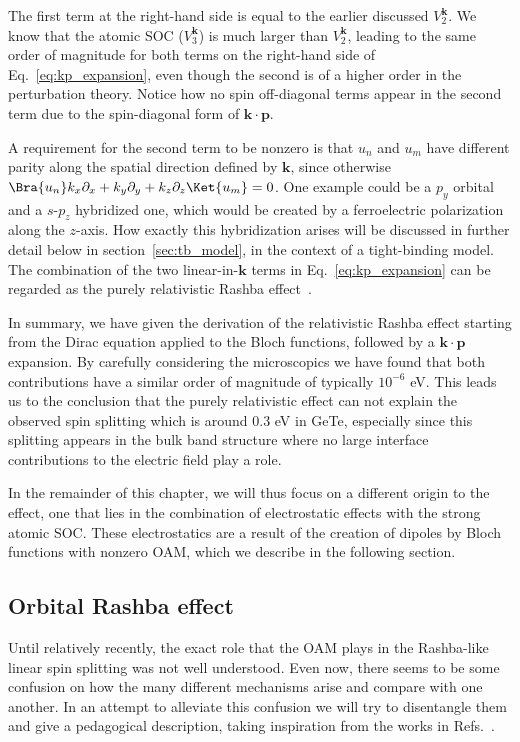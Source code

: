 The first term at the right-hand side is equal to the earlier discussed $V^{\bm k}_2$.
We know that the atomic SOC ($V^{\bm k}_3$) is much larger than $V^{\bm{k}}_2$, leading to the same order of magnitude for both terms on the right-hand side of Eq.~\eqref{eq:kp_expansion}, even though the second is of a higher order in the perturbation theory. Notice how no spin off-diagonal terms appear in the second term due to the spin-diagonal form of $\bm k \cdot \bm p$.

A requirement for the second term to be nonzero is that $u_n$ and $u_m$ have different parity along the spatial direction defined by $\bm{k}$, since otherwise $\Bra{u_n} k_x \partial_x + k_y \partial_y + k_z \partial_z \Ket{u_m} = 0$.
One example could be a $p_y$ orbital and a $s$-$p_z$ hybridized one, which would be created by a ferroelectric polarization along the $z$-axis.
How exactly this hybridization arises will be discussed in further detail below in section~\ref{sec:tb_model}, in the context of a tight-binding model.
The combination of the two linear-in-$\bm{k}$ terms in Eq.~\eqref{eq:kp_expansion} can be regarded as the purely relativistic Rashba effect~\cite{Bahramy2011}.
    
In summary, we have given the derivation of the relativistic Rashba effect starting from the Dirac equation applied to the Bloch functions, followed by a $\bm k \cdot \bm p$ expansion.
By carefully considering the microscopics we have found that both contributions have a similar order of magnitude of typically $10^{-6}$ eV.
This leads us to the conclusion that the purely relativistic effect can not explain the observed spin splitting which is around 0.3 eV in GeTe, especially since this splitting appears in the bulk band structure where no large interface contributions to the electric field play a role.

In the remainder of this chapter, we will thus focus on a different origin to the effect, one that lies in the combination of electrostatic effects with the strong atomic SOC.
These electrostatics are a result of the creation of dipoles by Bloch functions with nonzero OAM, which we describe in the following section. 
\subsection{Orbital Rashba effect}
Until relatively recently, the exact role that the OAM plays in the Rashba-like linear spin splitting was not well understood. Even now, there seems to be some confusion on how the many different mechanisms arise and compare with one another.   
In an attempt to alleviate this confusion we will try to disentangle them and give a pedagogical description, taking inspiration from the works in Refs.~\cite{Petersen2000,Park2011,Park2012,Kim2014,Park2015,Go2016}.
    
